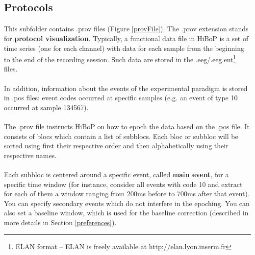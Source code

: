 \documentclass[a4paper]{article}
\begin{document}
\subsection{Protocols}
\paragraph{} This subfolder contains .prov files (Figure \ref{provFile}). The .prov extension stands for \textbf{protocol visualization}. Typically, a functional data file in HiBoP is a set of time series (one for each channel) with data for each sample from the beginning to the end of the recording session. Such data are stored in the .eeg/.eeg.ent\footnote{\label{ELAN}ELAN format – ELAN is freely available at http://elan.lyon.inserm.fr} files.
\paragraph{} In addition, information about the events of the experimental paradigm is stored in .pos files: event codes occurred at specific samples (e.g. an event of type 10 occurred at sample 134567).
\paragraph{} The .prov file instructs HiBoP on how to epoch the data based on the .pos file. It consists of blocs which contain a list of subblocs. Each bloc or subbloc will be sorted using first their respective order and then alphabetically using their respective names.
\paragraph{} Each subbloc is centered around a specific event, called \textbf{main event}, for a specific time window (for instance, consider all events with code 10 and extract for each of them a window ranging from 200ms before to 700ms after that event). You can specify secondary events which do not interfere in the epoching. You can also set a baseline window, which is used for the baseline correction (described in more details in Section \ref{preferences}). 
\end{document}
